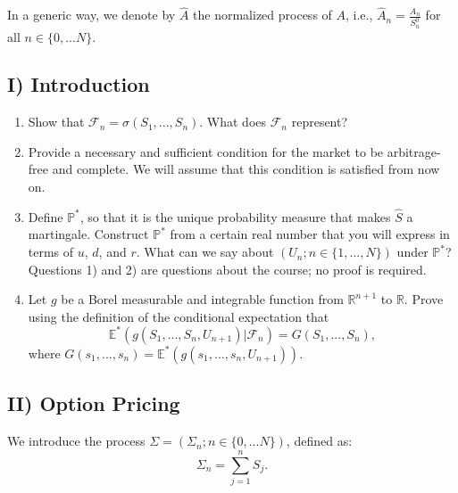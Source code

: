 \documentclass{article}
\begin{document}
In a generic way, we denote by $\hat{A}$ the normalized process of $A$, i.e., $\hat{A}_{n}=\frac{A_{n}}{S_{n}^{0}}$ for all $n\in\{0,...N\}$.

\subsection*{I) Introduction}
\begin{enumerate}
    \item Show that $\mathcal{F}_{n}=\sigma(S_{1},...,S_{n})$. What does $\mathcal{F}_{n}$ represent?
    \item Provide a necessary and sufficient condition for the market to be arbitrage-free and complete. We will assume that this condition is satisfied from now on.
    \item Define $\mathbb{P}^{*}$, so that it is the unique probability measure that makes $\hat{S}$ a martingale. Construct $\mathbb{P}^{*}$ from a certain real number that you will express in terms of $u$, $d$, and $r$. What can we say about $(U_{n};n\in\{1,...,N\})$ under $\mathbb{P}^{*}$? Questions 1) and 2) are questions about the course; no proof is required.
    \item Let $g$ be a Borel measurable and integrable function from $\mathbb{R}^{n+1}$ to $\mathbb{R}$. Prove using the definition of the conditional expectation that
    \[ \mathbb{E}^{*}(g(S_{1},...,S_{n},U_{n+1})|\mathcal{F}_{n})=G(S_{1},...,S_{n}), \]
    where $G(s_{1},...,s_{n})=\mathbb{E}^{*}(g(s_{1},...,s_{n},U_{n+1}))$.
\end{enumerate}

\subsection*{II) Option Pricing}
We introduce the process $\Sigma=(\Sigma_{n};n\in\{0,...N\})$, defined as:
\[ \Sigma_{n}=\sum_{j=1}^{n}S_{j}. \]
\end{document}
